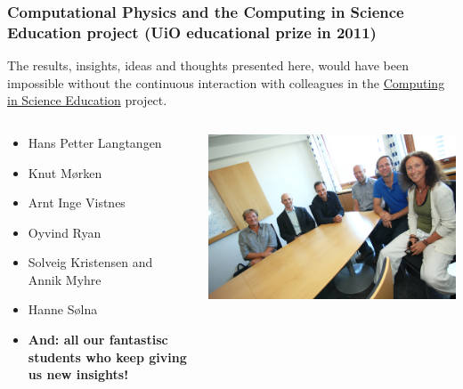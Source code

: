 \documentclass{beamer}
\begin{document}
\begin{frame}
\frametitle{Computational Physics and  the Computing in Science Education project (UiO educational prize in 2011)}

\begin{block}{}
The results, insights, ideas and thoughts presented here, would have been impossible without the continuous interaction with colleagues in the \href{{http://www.mn.uio.no/english/about/collaboration/cse/}}{Computing in Science Education} project.
\end{block}
\begin{columns}
\begin{block}{}
\begin{itemize}
\item Hans Petter Langtangen

\item Knut Mørken

\item Arnt Inge Vistnes

\item Oyvind Ryan

\item Solveig Kristensen and Annik Myhre

\item Hanne Sølna

\item \textbf{And: all our fantastisc students who keep giving us new insights!}
\end{itemize}

\noindent
\end{block}

\centerline{\includegraphics[width=1.0\linewidth]{fig-future/thegang.jpg}}



\end{columns}
\end{frame}
\end{document}
